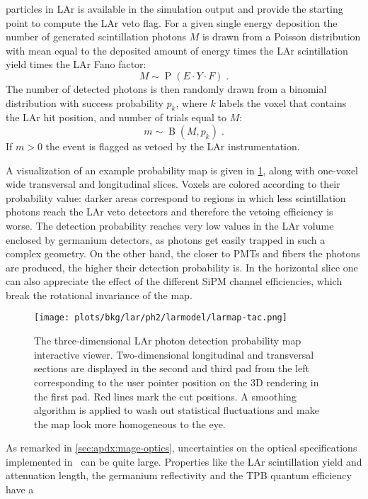 particles in LAr is available in the simulation output and provide the starting point to
compute the LAr veto flag. For a given single energy deposition the number of generated
scintillation photons $M$ is drawn from a Poisson distribution with mean equal to the
deposited amount of energy times the LAr scintillation yield times the LAr Fano factor:
\[
  M \sim \operatorname{P}(E \cdot Y \cdot F) \;.
\]
The number of detected photons is then randomly drawn from a binomial distribution with
success probability $p_k$, where $k$ labels the voxel that contains the LAr hit position,
and number of trials equal to $M$:
\[
  m \sim \operatorname{B}(M, p_k) \;.
\]
If $m>0$ the event is flagged as vetoed by the LAr instrumentation.

\sloppy A visualization of an example probability map is given in
\cref{fig:bkg:lar:ph2:larmap:tac}, along with one-voxel wide transversal and longitudinal
slices. Voxels are colored according to their probability value: darker areas correspond
to regions in which less scintillation photons reach the LAr veto detectors and therefore
the vetoing efficiency is worse. The detection probability reaches very low values in the
LAr volume enclosed by germanium detectors, as photons get easily trapped in such a
complex geometry. On the other hand, the closer to PMTs and fibers the photons are
produced, the higher their detection probability is. In the horizontal slice one can also
appreciate the effect of the different SiPM channel efficiencies, which break the
rotational invariance of the map.
\newpar
\begin{figure}
  \centering
  \texttt{[image: plots/bkg/lar/ph2/larmodel/larmap-tac.png]}
  \caption{%
    The three-dimensional LAr photon detection probability map interactive viewer.
    Two-dimensional longitudinal and transversal sections are displayed in the second and
    third pad from the left corresponding to the user pointer position on the 3D
    rendering in the first pad. Red lines mark the cut positions. A smoothing algorithm is
    applied to wash out statistical fluctuations and make the map look more homogeneous to
    the eye.
  }\label{fig:bkg:lar:ph2:larmap:tac}
\end{figure}
As remarked in \cref{sec:apdx:mage-optics}, uncertainties on the optical specifications
implemented in \mage\ can be quite large. Properties like the LAr scintillation yield and
attenuation length, the germanium reflectivity and the TPB quantum efficiency have a
